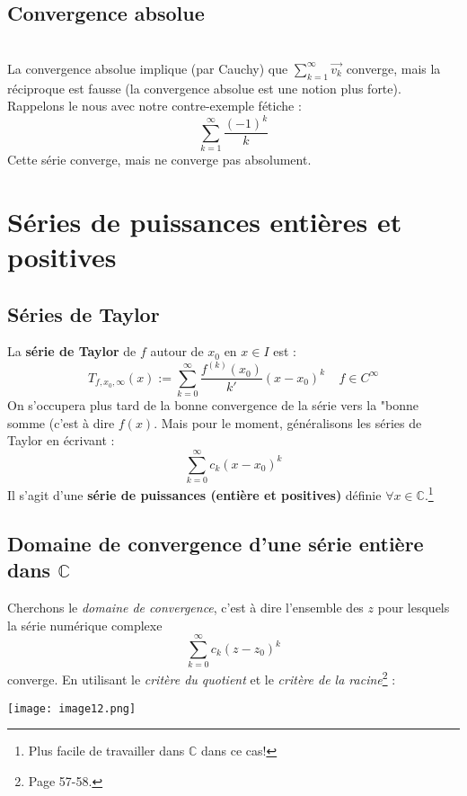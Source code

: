 \documentclass[11pt, a4paper, openany]{book}
\newcommand{\serie}{\sum_{k=1}^\infty}
\newcommand{\series}{\sum_{k=0}^\infty}
\begin{document}
\subsection{Convergence absolue}
\proposition{$\serie \vec{v_k}$ C.A. $\Leftrightarrow\ \serie ||\vec{v_k}||$ converge.}\ \\
La convergence absolue implique (par Cauchy) que $\serie\vec{v_k}$ converge, mais la réciproque est fausse (la convergence absolue est une notion plus forte). Rappelons le nous avec notre contre-exemple fétiche :
\begin{equation}
	\serie \frac{(-1)^k}{k}
\end{equation}
Cette série converge, mais ne converge pas absolument.
					
\section{Séries de puissances entières et positives}
\subsection{Séries de Taylor}
La \textbf{série de Taylor} de $f$ autour de $x_0$ en $x\in I$ est :
\begin{equation}
	T_{f,x_0,\infty}(x) := \series \frac{f^{(k)}(x_0)}{k'}(x-x_0)^k\ \ \ \ \ f \in C^\infty
\end{equation}
On s'occupera plus tard de la bonne convergence de la série vers la "bonne somme (c'est à dire $f(x)$. Mais pour le moment, généralisons les séries  de Taylor en écrivant :
\begin{equation}
	\series c_k(x-x_0)^k
\end{equation}
Il s'agit d'une \textbf{série de puissances (entière et positives)} définie $\forall x \in \mathbb{C}$.\footnote{Plus facile de travailler dans $\mathbb{C}$ dans ce cas!}
					
\subsection{Domaine de convergence d'une série entière dans $\mathbb{C}$}
Cherchons le \textit{domaine de convergence}, c'est à dire l'ensemble des $z$ pour lesquels la série numérique complexe
\begin{equation}
	\series c_k(z-z_0)^k
\end{equation}
converge.
En utilisant le \textit{critère du quotient} et le \textit{critère de la racine}\footnote{Page 57-58.} :
\begin{center}
	\texttt{[image: image12.png]}
\end{center}
					
\end{document}
